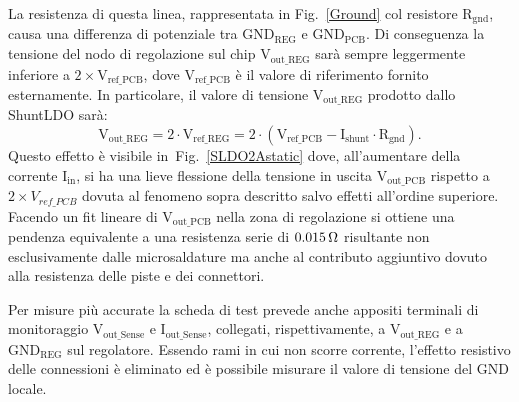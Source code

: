 La resistenza di questa linea, rappresentata in Fig.~\ref{Ground} col resistore $\mathrm{R_{gnd}}$, causa una differenza di potenziale tra $\mathrm{GND_{REG}}$ e $\mathrm{GND_{PCB}}$. Di conseguenza la tensione del nodo di regolazione sul chip $\mathrm{V_{out{\_}REG}}$ sar\`a sempre leggermente inferiore a $\mathrm{2\times V_{ref {\_} PCB}}$, dove $\mathrm{V_{ref {\_} PCB}}$ \`e il valore di riferimento fornito esternamente. In particolare, il valore di tensione $\mathrm{V_{out{\_}REG}}$ prodotto dallo ShuntLDO sarà:
\begin{equation}
  \mathrm{V_{out{\_}REG} = 2 \cdot V_{ref{\_}REG} = 2 \cdot ( V_{ref {\_} PCB} - I_{shunt} \cdot R_{gnd} )}.
\end{equation}
Questo effetto è visibile in~Fig.~\ref{SLDO2Astatic} dove, all'aumentare della corrente $\mathrm{I_{in}}$, si ha una lieve flessione della tensione in uscita $\mathrm{V_{out{\_}PCB}}$ rispetto a $2 \times V_{ref{\_}PCB}$ dovuta al fenomeno sopra descritto salvo effetti all'ordine superiore. Facendo un fit lineare di $\mathrm{V_{out{\_}PCB}}$ nella zona di regolazione si ottiene una pendenza equivalente a una resistenza serie di $0.015{\rm \, \Omega}$ risultante non esclusivamente dalle microsaldature ma anche al contributo aggiuntivo dovuto alla resistenza delle piste e dei connettori.

Per misure pi\`u accurate la scheda di test prevede anche appositi terminali di monitoraggio $\mathrm{V_{out{\_}Sense}}$ e $\mathrm{I_{out {\_} Sense}}$,
collegati, rispettivamente, a $\mathrm{V_{out{\_}REG}}$ e a $\mathrm{GND_{REG}}$ sul regolatore. Essendo rami in cui non scorre corrente, l'effetto resistivo delle connessioni è eliminato ed è possibile misurare il valore di tensione del GND locale.

